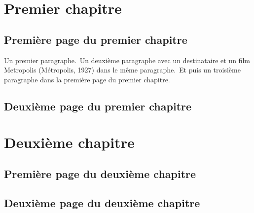 \chapter{Premier chapitre}
\section{Première page du premier chapitre}
Un premier paragraphe.\
Un deuxième paragraphe avec un destinataire et un film Metropolis (Métropolis, 1927) dans le même paragraphe.\
Et puis un troisième paragraphe dans la première page du premier chapitre.\
\section{Deuxième page du premier chapitre}
\chapter{Deuxième chapitre}
\section{Première page du deuxième chapitre}
\section{Deuxième page du deuxième chapitre}
